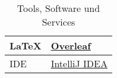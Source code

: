 \begin{table}[h!]
    \centering
    \begin{tabularx}{0.8\textwidth} {
    | >{\raggedright\arraybackslash}X
    | >{\raggedright\arraybackslash}X | }
        \hline
        \LaTeX & \sffamily \href{https://www.overleaf.com}{Overleaf} \\
        \hline
        \sffamily IDE & \sffamily \href{https://www.jetbrains.com/idea/}{IntelliJ IDEA} \\
        \hline
    \end{tabularx}
    \caption{\sffamily Tools, Software und Services}
    \label{tab:2}
\end{table}
